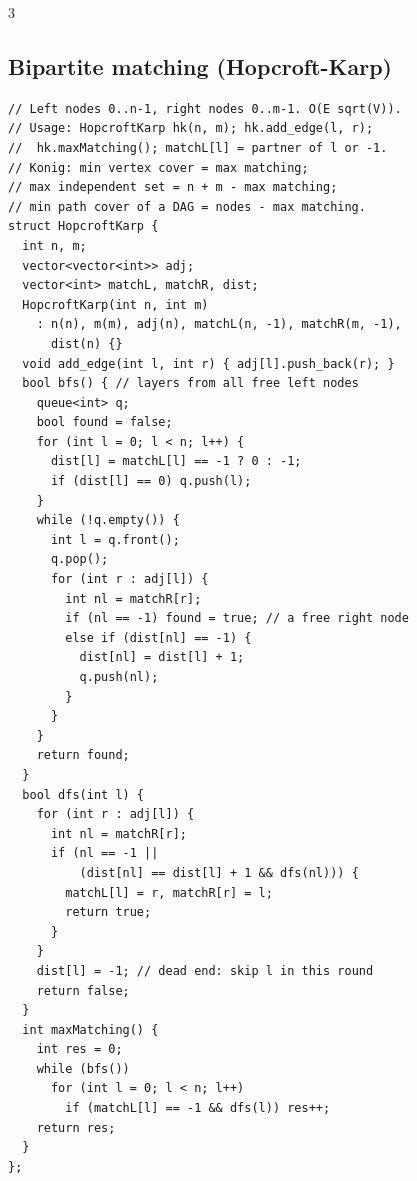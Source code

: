 \documentclass[8pt, a4paper]{article}
\begin{document}
\begin{multicols*}{3}
\subsection{Bipartite matching (Hopcroft-Karp)}
\begin{lstlisting}
// Left nodes 0..n-1, right nodes 0..m-1. O(E sqrt(V)).
// Usage: HopcroftKarp hk(n, m); hk.add_edge(l, r);
//  hk.maxMatching(); matchL[l] = partner of l or -1.
// Konig: min vertex cover = max matching;
// max independent set = n + m - max matching;
// min path cover of a DAG = nodes - max matching.
struct HopcroftKarp {
  int n, m;
  vector<vector<int>> adj;
  vector<int> matchL, matchR, dist;
  HopcroftKarp(int n, int m)
    : n(n), m(m), adj(n), matchL(n, -1), matchR(m, -1),
      dist(n) {}
  void add_edge(int l, int r) { adj[l].push_back(r); }
  bool bfs() { // layers from all free left nodes
    queue<int> q;
    bool found = false;
    for (int l = 0; l < n; l++) {
      dist[l] = matchL[l] == -1 ? 0 : -1;
      if (dist[l] == 0) q.push(l);
    }
    while (!q.empty()) {
      int l = q.front();
      q.pop();
      for (int r : adj[l]) {
        int nl = matchR[r];
        if (nl == -1) found = true; // a free right node
        else if (dist[nl] == -1) {
          dist[nl] = dist[l] + 1;
          q.push(nl);
        }
      }
    }
    return found;
  }
  bool dfs(int l) {
    for (int r : adj[l]) {
      int nl = matchR[r];
      if (nl == -1 ||
          (dist[nl] == dist[l] + 1 && dfs(nl))) {
        matchL[l] = r, matchR[r] = l;
        return true;
      }
    }
    dist[l] = -1; // dead end: skip l in this round
    return false;
  }
  int maxMatching() {
    int res = 0;
    while (bfs())
      for (int l = 0; l < n; l++)
        if (matchL[l] == -1 && dfs(l)) res++;
    return res;
  }
};
\end{lstlisting}

\end{multicols*}
\end{document}
